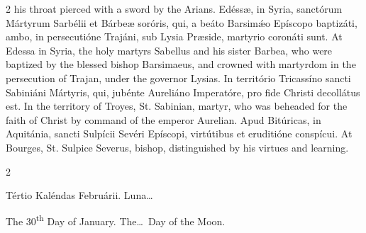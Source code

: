 \begin{paracol}{2}
 his throat pierced with a sword by the Arians.
\switchcolumn*
{}
Edéssæ, in Syria, sanctórum Mártyrum Sarbélii 
 et Bárbeæ soróris, qui, a beáto Barsimǽo Epíscopo baptizáti, ambo, in 
 persecutióne Trajáni, sub Lysia Præside, martyrio coronáti sunt.
\switchcolumn
{}
At Edessa in Syria, the holy martyrs Sabellus and his sister Barbea, who 
 were baptized by the blessed bishop Barsimaeus, and crowned with martyrdom 
 in the persecution of Trajan, under the governor Lysias.
\switchcolumn*
{}
In território Tricassíno sancti Sabiniáni Mártyris, qui, jubénte Aureliáno 
 Imperatóre, pro fide Christi decollátus est.
\switchcolumn
{}
In the territory of Troyes, St. Sabinian, martyr, who was beheaded for the 
 faith of Christ by command of the emperor Aurelian.
\switchcolumn*
{}
Apud Bitúricas, in Aquitánia, sancti Sulpícii Sevéri 
 Epíscopi, virtútibus et eruditióne conspícui.
\switchcolumn
{}
At Bourges, St. Sulpice Severus, bishop, distinguished by his virtues and 
 learning.
\switchcolumn*
{}
\end{paracol}


\begin{paracol}{2}
\begin{center}{\color{gregoriocolor} Tértio Kaléndas Februárii. 
 Luna\dots\ }\end{center}
\switchcolumn
{}
\begin{center}{\color{gregoriocolor} The 30\textsuperscript{th} Day of 
 January. The\dots\ Day of the Moon.}\end{center}
\end{paracol}

